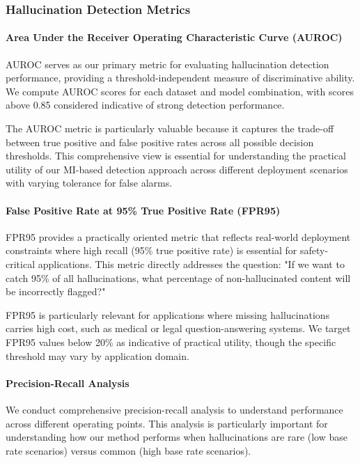 \subsubsection{Hallucination Detection Metrics}

\paragraph{Area Under the Receiver Operating Characteristic Curve (AUROC)}
AUROC serves as our primary metric for evaluating hallucination detection performance, providing a threshold-independent measure of discriminative ability. We compute AUROC scores for each dataset and model combination, with scores above 0.85 considered indicative of strong detection performance.

The AUROC metric is particularly valuable because it captures the trade-off between true positive and false positive rates across all possible decision thresholds. This comprehensive view is essential for understanding the practical utility of our MI-based detection approach across different deployment scenarios with varying tolerance for false alarms.

\paragraph{False Positive Rate at 95\% True Positive Rate (FPR95)}
FPR95 provides a practically oriented metric that reflects real-world deployment constraints where high recall (95\% true positive rate) is essential for safety-critical applications. This metric directly addresses the question: "If we want to catch 95\% of all hallucinations, what percentage of non-hallucinated content will be incorrectly flagged?"

FPR95 is particularly relevant for applications where missing hallucinations carries high cost, such as medical or legal question-answering systems. We target FPR95 values below 20\% as indicative of practical utility, though the specific threshold may vary by application domain.

\paragraph{Precision-Recall Analysis}
We conduct comprehensive precision-recall analysis to understand performance across different operating points. This analysis is particularly important for understanding how our method performs when hallucinations are rare (low base rate scenarios) versus common (high base rate scenarios).

